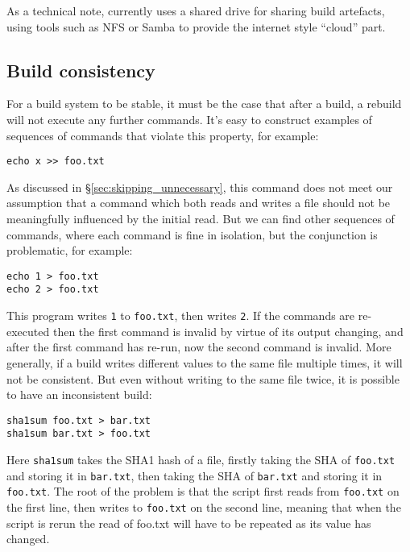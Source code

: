 As a technical note, currently \Rattle uses a shared drive for sharing build artefacts, using tools such as NFS or Samba to provide the internet style ``cloud'' part.

\subsection{Build consistency}
\label{sec:hazards}

For a \Make build system to be stable, it must be the case that after a build, a rebuild will not execute any further commands. It's easy to construct examples of sequences of commands that violate this property, for example:

\begin{verbatim}
echo x >> foo.txt
\end{verbatim}



As discussed in \S\ref{sec:skipping_unnecessary}, this command does not meet our assumption that a command which both reads and writes a file should not be meaningfully influenced by the initial read. But we can find other sequences of commands, where each command is fine in isolation, but the conjunction is problematic, for example:

\begin{verbatim}
echo 1 > foo.txt
echo 2 > foo.txt
\end{verbatim}

This program writes \texttt{1} to \texttt{foo.txt}, then writes \texttt{2}. If the commands are re-executed then the first command is invalid by virtue of its output changing, and after the first command has re-run, now the second command is invalid. More generally, if a build writes different values to the same file multiple times, it will not be consistent. But even without writing to the same file twice, it is possible to have an inconsistent build:

\begin{verbatim}
sha1sum foo.txt > bar.txt
sha1sum bar.txt > foo.txt
\end{verbatim}

Here \texttt{sha1sum} takes the SHA1 hash of a file, firstly taking the SHA of \texttt{foo.txt} and storing it in \texttt{bar.txt}, then taking the SHA of \texttt{bar.txt} and storing it in \texttt{foo.txt}. The root of the problem is that the script first reads from \texttt{foo.txt} on the first line, then writes to \texttt{foo.txt} on the second line, meaning that when the script is rerun the read of foo.txt will have to be repeated as its value has changed.

